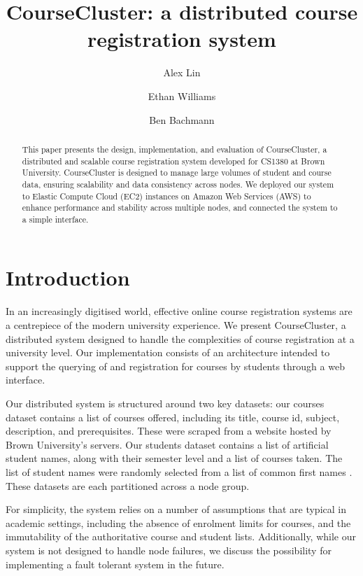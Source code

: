 \documentclass[sigplan, screen, 10pt]{acmart}
\title{CourseCluster: a distributed course registration system}
\author{Alex Lin}
\affiliation{Brown University}
\author{Ethan Williams}
\affiliation{Brown University}
\author{Ben Bachmann}
\affiliation{Brown University}
\begin{document}
\begin{abstract}
  This paper presents the design, implementation, and evaluation of CourseCluster, a distributed and scalable course registration system developed for CS1380 at Brown University. CourseCluster is designed to manage large volumes of student and course data, ensuring scalability and data consistency across nodes. We deployed our system to Elastic Compute Cloud (EC2) instances on Amazon Web Services (AWS) to enhance performance and stability across multiple nodes, and connected the system to a simple interface.
\end{abstract}

\maketitle


\section{Introduction}

In an increasingly digitised world, effective online course registration systems are a centrepiece of the modern university experience. We present CourseCluster, a distributed system designed to handle the complexities of course registration at a university level. Our implementation consists of an architecture intended to support the querying of and registration for courses by students through a web interface.

Our distributed system is structured around two key datasets: our courses dataset contains a list of courses offered, including its title, course id, subject, description, and prerequisites. These were scraped from a website hosted by Brown University’s servers. Our students dataset contains a list of artificial student names, along with their semester level and a list of courses taken. The list of student names were randomly selected from a list of common first names \cite{babynames}. These datasets are each partitioned across a node group.

For simplicity, the system relies on a number of assumptions that are typical in academic settings, including the absence of enrolment limits for courses, and the immutability of the authoritative course and student lists. Additionally, while our system is not designed to handle node failures, we discuss the possibility for implementing a fault tolerant system in the future.
\end{document}
